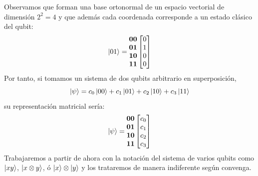 \documentclass[a4paper]{article}
\numberwithin{equation}{section}
\begin{document}
Observamos que forman una base ortonormal de un espacio vectorial de dimensión $2^2 = 4$ y que además cada coordenada corresponde a un estado clásico del qubit:
\begin{equation}
\ket{01} =
\begin{matrix}
	\textbf{00} \\ \textbf{01} \\ \textbf{10} \\ \textbf{11}
\end{matrix}
\begin{bmatrix}
	0 \\ 1 \\ 0 \\ 0
\end{bmatrix}
\end{equation}
Por tanto, si tomamos un sistema de dos qubits arbitrario en superposición,
\begin{equation}
\ket{\psi} = c_0 \ket{00} + c_1 \ket{01} + c_2 \ket{10} + c_3 \ket{11}
\end{equation}
su representación matricial sería:
\begin{equation}
\ket{\psi} =
\begin{matrix}
	\textbf{00} \\ \textbf{01} \\ \textbf{10} \\ \textbf{11}
\end{matrix}
\begin{bmatrix}
	c_0 \\ c_1 \\ c_2 \\ c_3
\end{bmatrix}
\end{equation}
Trabajaremos a partir de ahora con la notación del sistema de varios qubits como $\ket{xy}$, $\ket{x\otimes y}$, ó $\ket{x}\otimes\ket{y}$ y los trataremos de manera indiferente según convenga.
\end{document}
